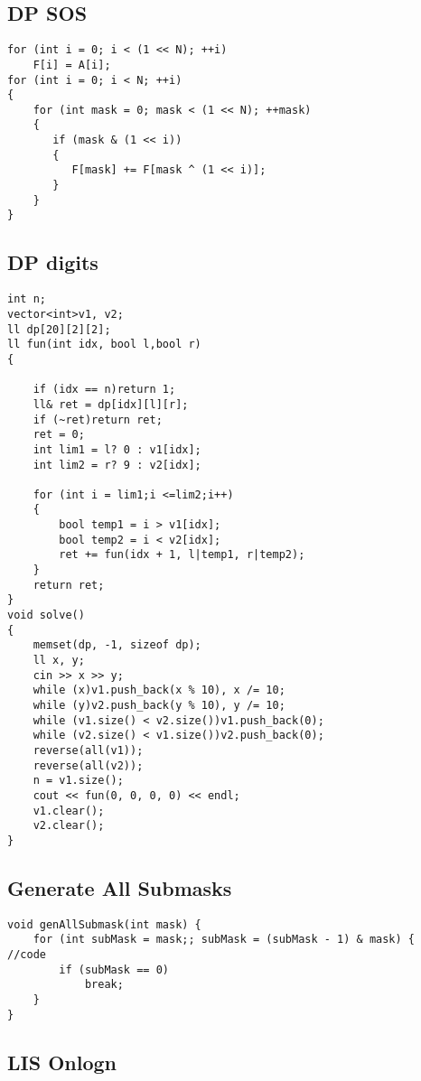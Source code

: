 {\subsection{DP SOS}

\begin{lstlisting}[style=cpp]
for (int i = 0; i < (1 << N); ++i)  
    F[i] = A[i];  
for (int i = 0; i < N; ++i)  
{  
    for (int mask = 0; mask < (1 << N); ++mask)  
    {  
       if (mask & (1 << i))  
       {  
          F[mask] += F[mask ^ (1 << i)];  
       }  
    }  
}
\end{lstlisting}

\subsection{DP digits}

\begin{lstlisting}[style=cpp]
int n;
vector<int>v1, v2;
ll dp[20][2][2];
ll fun(int idx, bool l,bool r)
{

	if (idx == n)return 1;
	ll& ret = dp[idx][l][r];
	if (~ret)return ret;
	ret = 0;
	int lim1 = l? 0 : v1[idx];
	int lim2 = r? 9 : v2[idx];

	for (int i = lim1;i <=lim2;i++)
	{
		bool temp1 = i > v1[idx];
		bool temp2 = i < v2[idx];
	    ret += fun(idx + 1, l|temp1, r|temp2);
	}
	return ret;
}
void solve()
{
	memset(dp, -1, sizeof dp);
	ll x, y;
	cin >> x >> y;
	while (x)v1.push_back(x % 10), x /= 10;
	while (y)v2.push_back(y % 10), y /= 10;
	while (v1.size() < v2.size())v1.push_back(0);
	while (v2.size() < v1.size())v2.push_back(0);
	reverse(all(v1));
	reverse(all(v2));
	n = v1.size();
	cout << fun(0, 0, 0, 0) << endl;
	v1.clear();
	v2.clear();
}
\end{lstlisting}

\subsection{Generate All Submasks}

\begin{lstlisting}[style=cpp]
void genAllSubmask(int mask) {  
    for (int subMask = mask;; subMask = (subMask - 1) & mask) {  
//code  
        if (subMask == 0)  
            break;  
    }  
}
\end{lstlisting}

\subsection{LIS Onlogn}

}
